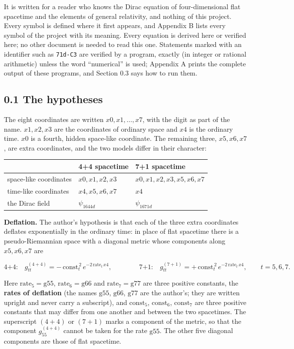 \documentclass[
  10pt,
]{article}
\begin{document}
It is written for a reader who knows the Dirac equation of
four-dimensional flat spacetime and the elements of general relativity,
and nothing of this project. Every symbol is defined where it first
appears, and Appendix B lists every symbol of the project with its
meaning. Every equation is derived here or verified here; no other
document is needed to read this one. Statements marked with an
identifier such as \texttt{71d-C3} are verified by a program, exactly
(in integer or rational arithmetic) unless the word ``numerical'' is
used; Appendix A prints the complete output of these programs, and
Section 0.3 says how to run them.

\hypertarget{the-hypotheses}{%
\subsection{0.1 The hypotheses}\label{the-hypotheses}}

The eight coordinates are written \(x0,x1,\dots,x7\), with the digit as
part of the name. \(x1,x2,x3\) are the coordinates of ordinary space and
\(x4\) is the ordinary time. \(x0\) is a fourth, hidden space-like
coordinate. The remaining three, \(x5,x6,x7\), are extra coordinates,
and the two models differ in their character:

\begin{longtable}[]{@{}lll@{}}
\toprule\noalign{}
& 4+4 spacetime & 7+1 spacetime \\
\midrule\noalign{}
\endhead
\bottomrule\noalign{}
\endlastfoot
space-like coordinates & \(x0,x1,x2,x3\) & \(x0,x1,x2,x3,x5,x6,x7\) \\
time-like coordinates & \(x4,x5,x6,x7\) & \(x4\) \\
the Dirac field & \(\psi_{1644d}\) & \(\psi_{1671d}\) \\
\end{longtable}

\textbf{Deflation.} The author's hypothesis is that each of the three
extra coordinates deflates exponentially in the ordinary time: in place
of flat spacetime there is a pseudo-Riemannian space with a diagonal
metric whose components along \(x5,x6,x7\) are

\[\text{4+4:}\quad g^{(4+4)}_{tt}=-\,\mathrm{const}_t^{\,2}\,e^{-2\,\mathrm{rate}_t\,x4},\qquad\qquad
\text{7+1:}\quad g^{(7+1)}_{tt}=+\,\mathrm{const}_t^{\,2}\,e^{-2\,\mathrm{rate}_t\,x4},\qquad t=5,6,7.\tag{0.1}\]

Here \(\mathrm{rate}_5=\mathrm{g55}\), \(\mathrm{rate}_6=\mathrm{g66}\)
and \(\mathrm{rate}_7=\mathrm{g77}\) are three positive constants, the
\textbf{rates of deflation} (the names \(\mathrm{g55}\),
\(\mathrm{g66}\), \(\mathrm{g77}\) are the author's; they are written
upright and never carry a subscript), and \(\mathrm{const}_5\),
\(\mathrm{const}_6\), \(\mathrm{const}_7\) are three positive constants
that may differ from one another and between the two spacetimes. The
superscript \((4+4)\) or \((7+1)\) marks a component of the metric, so
that the component \(g^{(4+4)}_{55}\) cannot be taken for the rate
\(\mathrm{g55}\). The other five diagonal components are those of flat
spacetime.
\end{document}
